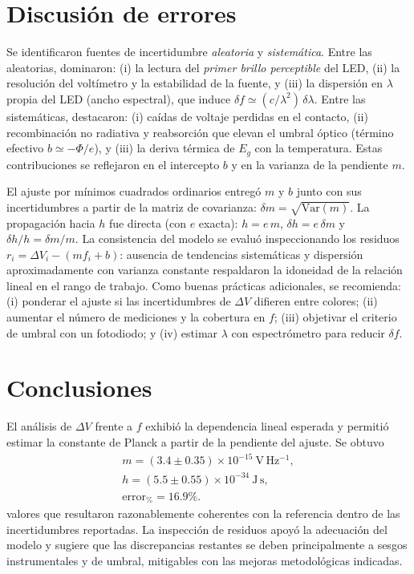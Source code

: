 \documentclass[11pt,twocolumn]{article}
\begin{document}
\section{Discusión de errores}
Se identificaron fuentes de incertidumbre \textit{aleatoria} y \textit{sistemática}. Entre las aleatorias, dominaron: (i) la lectura del \emph{primer brillo perceptible} del LED, (ii) la resolución del voltímetro y la estabilidad de la fuente, y (iii) la dispersión en \(\lambda\) propia del LED (ancho espectral), que induce \(\delta f \simeq (c/\lambda^{2})\,\delta\lambda\). Entre las sistemáticas, destacaron: (i) caídas de voltaje perdidas en el contacto, (ii) recombinación no radiativa y reabsorción que elevan el umbral óptico (término efectivo \(b\simeq -\Phi/e\)), y (iii) la deriva térmica de \(E_g\) con la temperatura. Estas contribuciones se reflejaron en el intercepto \(b\) y en la varianza de la pendiente \(m\).

El ajuste por mínimos cuadrados ordinarios entregó \(m\) y \(b\) junto con sus incertidumbres a partir de la matriz de covarianza: \(\delta m=\sqrt{\mathrm{Var}(m)}\). La propagación hacia \(h\) fue directa (con \(e\) exacta): \(h=e\,m\), \(\delta h=e\,\delta m\) y \(\delta h/h=\delta m/m\). La consistencia del modelo se evaluó inspeccionando los residuos \(r_i=\Delta V_i-(m f_i+b)\): ausencia de tendencias sistemáticas y dispersión aproximadamente con varianza constante respaldaron la idoneidad de la relación lineal en el rango de trabajo. Como buenas prácticas adicionales, se recomienda: (i) ponderar el ajuste si las incertidumbres de \(\Delta V\) difieren entre colores; (ii) aumentar el número de mediciones y la cobertura en \(f\); (iii) objetivar el criterio de umbral con un fotodiodo; y (iv) estimar \(\lambda\) con espectrómetro para reducir \(\delta f\).

\section{Conclusiones}
El análisis de \(\Delta V\) frente a \(f\) exhibió la dependencia lineal esperada y permitió estimar la constante de Planck a partir de la pendiente del ajuste. Se obtuvo
\begin{align*}
    m=(3.4\pm0.35)\times10^{-15}\ \mathrm{V\,Hz^{-1}},\\[4pt]
h=(5.5\pm0.55)\times10^{-34}\ \mathrm{J\,s},\\[4pt]
\mathrm{error}_{\%}=16.9\%.
\end{align*}
valores que resultaron razonablemente coherentes con la referencia dentro de las incertidumbres reportadas. La inspección de residuos apoyó la adecuación del modelo y sugiere que las discrepancias restantes se deben principalmente a sesgos instrumentales y de umbral, mitigables con las mejoras metodológicas indicadas.

\printbibliography
\end{document}
